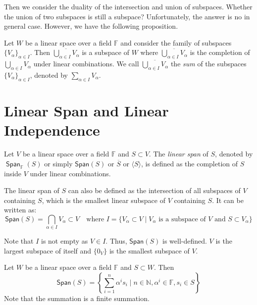 \documentclass[
	11pt, %
	fleqn, %
	a4paper, %
]{LegrandOrangeBook}
\renewcommand{\span}[1]{\mathsf{Span}(#1)} %
\renewcommand{\bar}[1]{\overline{#1}} %
\newcommand{\F}{\mathbb{F}} %
\DeclareMathOperator{\Span}{\mathsf{Span}}
\begin{document}
Then we consider the duality of the intersection and union of subspaces. Whether the union of two subspaces is still a subspace? Unfortunately, the answer is no in general case. However, we have the following proposition.

\begin{proposition}
    Let $W$ be a linear space over a field $\F$ and consider the family of subspaces $\{V_\alpha\}_{\alpha \in I}$. Then $\bar{\bigcup_{\alpha \in I} V_\alpha}$ is a subspace of $W$ where $\bar{\bigcup_{\alpha \in I} V_\alpha}$ is the completion of $\bigcup_{\alpha \in I} V_\alpha$ under linear combinations. We call $\bar{\bigcup_{\alpha \in I} V_\alpha}$ the \emph{sum} of the subspaces $\{V_\alpha\}_{\alpha \in I}$, denoted by $\sum_{\alpha \in I} V_\alpha$.
\end{proposition}

\newpage

\section{Linear Span and Linear Independence}

\begin{definition}
    Let $V$ be a linear space over a field $\F$ and $S \subset V$. The \emph{linear span} of $S$, denoted by $\Span_\F (S)$ or simply $\span S$ or $\bar{S}$ or $\langle S \rangle$, is defined as the completion of $S$ inside $V$ under linear combinations.
\end{definition}

\begin{corollary}
    The linear span of $S$ can also be defined as the intersection of all subspaces of $V$ containing $S$, which is the smallest linear subspace of $V$ containing $S$. It can be written as:
    \[
        \span S = \bigcap_{\alpha \in I} V_{\alpha} \subset V \quad \text{where } I = \{ V_{\alpha} \subset V \mid V_{\alpha} \text{ is a subspace of } V \text{ and } S \subset V_{\alpha} \}
    \]
\end{corollary}

\begin{remark}
    Note that $I$ is not empty as $V \in I$. Thus, $\span S$ is well-defined. $V$ is the largest subspace of itself and $\{0_V\}$ is the smallest subspace of $V$.
\end{remark}

\begin{proposition}
    Let $W$ be a linear space over a field $\F$ and $S \subset W$. Then 
    \[
        \span S = \left\{ \sum_{i=1}^{n} \alpha^i s_i \mid n \in \mathbb{N}, \alpha^i \in \F, s_i \in S \right\}
    \]
    Note that the summation is a finite summation.
\end{proposition}
\end{document}
